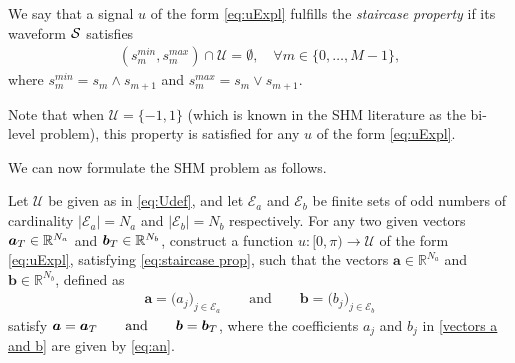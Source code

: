 \documentclass[twocolumn]{autart}    %
\begin{document}
\vspace{0.5em}
\begin{definition}\label{def:staircase prop}
	We say that a signal $u$ of the form \eqref{eq:uExpl} fulfills the \emph{staircase property} if its waveform $\mathcal{S}$ satisfies
	\begin{gather}\label{eq:staircase prop}
		(s_m^{min},s_{m}^{max}) \cap \mathcal{U} = \emptyset, \quad \forall m\in \{ 0, \ldots, M-1 \},
	\end{gather}
	where $s^{min}_m = s_m\wedge s_{m+1}$ and $s^{max}_m = s_m \vee s_{m+1}.$
\end{definition}

Note that when $\mathcal{U} = \{-1,1\}$ (which is known in the SHM literature as the bi-level problem), this property is satisfied for any $u$ of the form \eqref{eq:uExpl}.

We can now formulate the SHM problem as follows.

\vspace{0.5em}
\begin{problem}[SHM]\label{pb:SHEp}
	Let $\mathcal{U}$ be given as in \eqref{eq:Udef}, and let $\mathcal{E} _a $ and $\mathcal{E} _b $ be finite sets of odd numbers of cardinality $|\mathcal{E}_a| = N_a $ and $ |\mathcal{E} _b| = N_b$ respectively. For any two given vectors $\bm{a}_T \in \mathbb{R}^{N_a}$ and $\bm{b}_T \in \mathbb{R}^{N_b} $, construct a function $u: [0,\pi)\to\mathcal{U}$ of the form \eqref{eq:uExpl}, satisfying \eqref{eq:staircase prop}, such that the vectors $\bm{a} \in \mathbb{R}^{N_a}$ and $\bm{b} \in \mathbb{R}^{N_b}$, defined as
	\begin{align}\label{vectors a and b}
		\bm{a} = \big( a_j \big)_{j\in \mathcal{E}_a} \qquad \text{and} \qquad
		\bm{b} = \big( b_j \big)_{j\in \mathcal{E}_b}
	\end{align}
	satisfy $\bm{a} = \bm{a}_T \qquad \text{and} \qquad \bm{b} = \bm{b}_T$, where the coefficients $a_j$ and $b_j$ in \eqref{vectors a and b} are given by \eqref{eq:an}.
\end{problem}  
\end{document}
